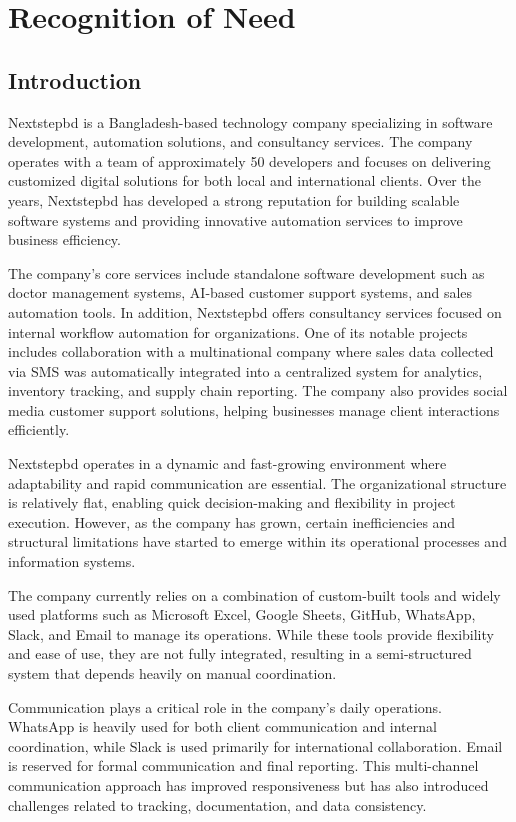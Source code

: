 \documentclass[12pt,a4paper]{report}
\begin{document}
\tableofcontents
\listoffigures

\chapter{Recognition of Need}

\section{Introduction}

Nextstepbd is a Bangladesh-based technology company specializing in software development, automation solutions, and consultancy services. The company operates with a team of approximately 50 developers and focuses on delivering customized digital solutions for both local and international clients. Over the years, Nextstepbd has developed a strong reputation for building scalable software systems and providing innovative automation services to improve business efficiency.

The company's core services include standalone software development such as doctor management systems, AI-based customer support systems, and sales automation tools. In addition, Nextstepbd offers consultancy services focused on internal workflow automation for organizations. One of its notable projects includes collaboration with a multinational company where sales data collected via SMS was automatically integrated into a centralized system for analytics, inventory tracking, and supply chain reporting. The company also provides social media customer support solutions, helping businesses manage client interactions efficiently.

Nextstepbd operates in a dynamic and fast-growing environment where adaptability and rapid communication are essential. The organizational structure is relatively flat, enabling quick decision-making and flexibility in project execution. However, as the company has grown, certain inefficiencies and structural limitations have started to emerge within its operational processes and information systems.

The company currently relies on a combination of custom-built tools and widely used platforms such as Microsoft Excel, Google Sheets, GitHub, WhatsApp, Slack, and Email to manage its operations. While these tools provide flexibility and ease of use, they are not fully integrated, resulting in a semi-structured system that depends heavily on manual coordination.

Communication plays a critical role in the company's daily operations. WhatsApp is heavily used for both client communication and internal coordination, while Slack is used primarily for international collaboration. Email is reserved for formal communication and final reporting. This multi-channel communication approach has improved responsiveness but has also introduced challenges related to tracking, documentation, and data consistency.
\end{document}
